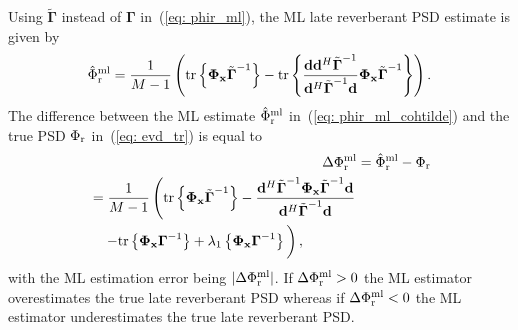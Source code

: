 \documentclass[10pt]{IEEEtran}
\begin{document}
Using $\tilde{\boldsymbol{\Gamma}}$ instead of $\boldsymbol{\Gamma}$ in~(\ref{eq: phir_ml}), the ML late reverberant PSD estimate is given by 
\begin{equation}
\label{eq: phir_ml_cohtilde}
\hat{\Phi}_{\rm r}^{\rm ml} = \frac{1}{M-1} \left( {\rm tr} \left\{  \boldsymbol{\Phi}_{\mathbf{x}}\tilde{\boldsymbol{\Gamma}}^{-1} \right\} - {\rm tr} \left\{ \frac{{\mathbf{d}}{\mathbf{d}}^{H}\tilde{\boldsymbol{\Gamma}}^{-1}}{{\mathbf{d}}^H\tilde{\boldsymbol{\Gamma}}^{-1}{\mathbf{d}}} \boldsymbol{\Phi}_{\mathbf{x}}\tilde{\boldsymbol{\Gamma}}^{-1}\right\} \right).
\end{equation}
The difference between the ML estimate $\hat{\Phi}^{\rm ml}_{\rm r}$ in~(\ref{eq: phir_ml_cohtilde}) and the true PSD $\Phi_{\rm r}$ in~(\ref{eq: evd_tr}) is equal to
\begin{align}
\Delta \Phi^{\rm ml}_{\rm r} & = \hat{\Phi}^{\rm ml}_{\rm r} - \Phi_{\rm r} \\
\label{eq: ml_finalcoh}
\begin{split}
&= \frac{1}{M-1} \left( \vphantom{\frac12} {\rm tr} \left\{ \boldsymbol{\Phi}_{\mathbf{x}}\tilde{\boldsymbol{\Gamma}}^{-1} \right\} - \frac{\mathbf{d}^H \tilde{\boldsymbol{\Gamma}}^{-1}  \mathbf{\Phi}_{\mathbf{x}} \tilde{\boldsymbol{\Gamma}}^{-1} \mathbf{d}}{\mathbf{d}^H \tilde{\boldsymbol{\Gamma}}^{-1} \mathbf{d}} \right. \\
  &\quad \left. -{\rm tr} \left\{ \boldsymbol{\Phi}_{\mathbf{x}}\boldsymbol{\Gamma}^{-1} \right\} +\lambda_1\left\{ \mathbf{\Phi}_{\mathbf{x}}\boldsymbol{\Gamma}^{-1}\right\}  \vphantom{\frac12}\right),
\end{split}
\end{align}
with the ML estimation error being $|\Delta \Phi^{\rm ml}_{\rm r}|$.
If $\Delta \Phi^{\rm ml}_{\rm r} > 0$ the ML estimator overestimates the true late reverberant PSD whereas if $\Delta \Phi^{\rm ml}_{\rm r} < 0$ the ML estimator underestimates the true late reverberant PSD.
\end{document}
